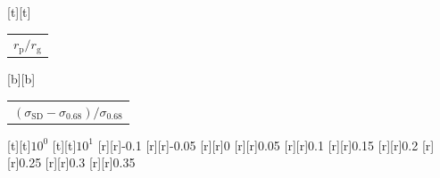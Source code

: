 %    
%
%
\begin{psfrags}%
\psfragscanon%
%
[t][t]{\color[rgb]{0,0,0}\setlength{\tabcolsep}{0pt}\begin{tabular}{c}{\Large$r_\mathrm{p}/r_\mathrm{g}$}\end{tabular}}%
[b][b]{\color[rgb]{0,0,0}\setlength{\tabcolsep}{0pt}\begin{tabular}{c}{\Large$(\sigma_\mathrm{SD}-\sigma_{0.68})/\sigma_{0.68}$}\end{tabular}}%
%
[t][t]{$10^{0}$}%
[t][t]{$10^{1}$}%
%
[r][r]{-0.1}%
[r][r]{-0.05}%
[r][r]{0}%
[r][r]{0.05}%
[r][r]{0.1}%
[r][r]{0.15}%
[r][r]{0.2}%
[r][r]{0.25}%
[r][r]{0.3}%
[r][r]{0.35}%
%
%
\end{psfrags}%
%
